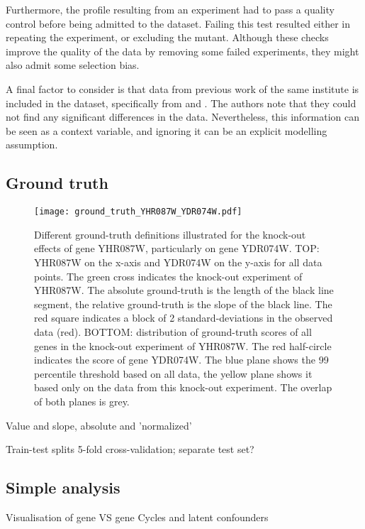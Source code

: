 Furthermore, the profile resulting from an experiment had to pass a quality control before being admitted to the dataset. Failing this test resulted either in repeating the experiment, or excluding the mutant. Although these checks improve the quality of the data by removing some failed experiments, they might also admit some selection bias.

A final factor to consider is that  data from previous work of the same institute is included in the dataset, specifically from \citeauthor{lenstra2011specificity} and \citeauthor{van2010functional}. The authors note that they could not find any significant differences in the data. Nevertheless, this information can be seen as a context variable, and ignoring it can be an explicit modelling assumption.

\subsection*{Ground truth}

\begin{figure}[h]
    \centering
    \texttt{[image: ground\_truth\_YHR087W\_YDR074W.pdf]}
    \caption{
        Different ground-truth definitions illustrated for the knock-out effects of gene YHR087W, particularly on gene YDR074W. TOP: YHR087W on the x-axis and YDR074W on the y-axis for all data points. The green cross indicates the knock-out experiment of YHR087W. The absolute ground-truth is the length of the black line segment, the relative ground-truth is the slope of the black line. The red square indicates a block of 2 standard-deviations in the observed data (red). BOTTOM: distribution of ground-truth scores of all genes in the knock-out experiment of YHR087W. The red half-circle indicates the score of gene YDR074W. The blue plane shows the 99 percentile threshold based on all data, the yellow plane shows it based only on the data from this knock-out experiment. The overlap of both planes is grey.
    }
    \label{fig:ground-truth}
\end{figure}


Value and slope, absolute and 'normalized'

Train-test splits
5-fold cross-validation; separate test set?

\subsection*{Simple analysis}
Visualisation of gene VS gene
Cycles and latent confounders